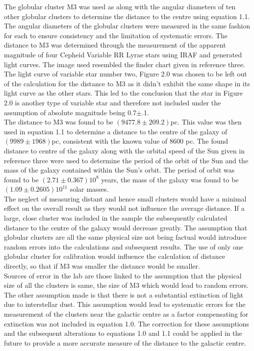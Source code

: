 \documentclass{article}
\begin{document}
The globular cluster M3 was used as along with the angular diameters of ten other globular clusters to determine the distance to the centre using equation 1.1. The angular diameters of the globular clusters were measured in the same fashion for each to ensure consistency and the limitation of systematic errors. The distance to M3 was determined through the measurement of the apparent magnitude of four Cepheid Variable RR Lyrae stars using IRAF and generated light curves. The image used resembled the finder chart given in reference three. The light curve of variable star number two, Figure 2.0 was chosen to be left out of the calculation for the distance to M3 as it didn’t exhibit the same shape in its light curve as the other stars. This led to the conclusion that the star in Figure 2.0 is another type of variable star and therefore not included under the assumption of absolute magnitude being 0.7$\pm$.1.\\

The distance to M3 was found to be $(9477.8\pm209.2)$pc. This value was then used in equation 1.1 to determine a distance to the centre of the galaxy of $(9989\pm1968)$pc, consistent with the known value of 8600 pc. The found distance to centre of the galaxy along with the orbital speed of the Sun given in reference three were used to determine the period of the orbit of the Sun and the mass of the galaxy contained within the Sun’s orbit. The period of orbit was found to be $(2.71\pm0.367)10^8$ years, the mass of the galaxy was found to be $(1.09\pm0.2605)10^{11}$ solar masses.\\

The neglect of measuring distant and hence small clusters would have a minimal effect on the overall result as they would not influence the average distance. If a large, close cluster was included in the sample the subsequently calculated distance to the centre of the galaxy would decrease greatly. The assumption that globular clusters are all the same physical size not being factual would introduce random errors into the calculations and subsequent results. The use of only one globular cluster for calibration would influence the calculation of distance directly, so that if M3 was smaller the distance would be smaller.\\

Sources of error in the lab are those linked to the assumption that the physical size of all the clusters is same, the size of M3 which would lead to random errors. The other assumption made is that there is not a substantial extinction of light due to interstellar dust. This assumption would lead to systematic errors for the measurement of the clusters near the galactic centre as a factor compensating for extinction was not included in equation 1.0. The correction for these assumptions and the subsequent alterations to equations 1.0 and 1.1 could be applied in the future to provide a more accurate measure of the distance to the galactic centre.
\end{document}
